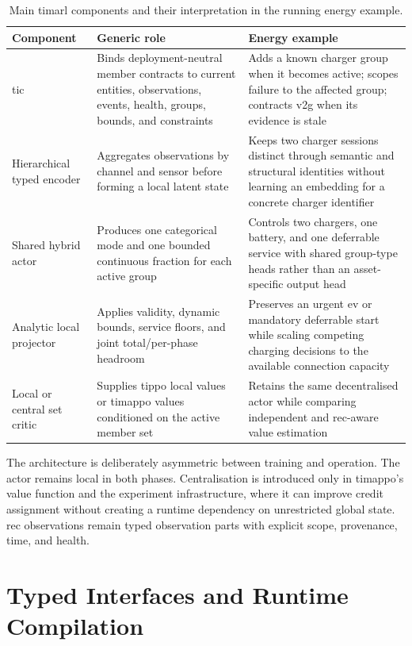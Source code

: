 \begin{table}[htbp]
\centering
\caption{Main \gls{timarl} components and their interpretation in the running energy example.}
\label{tab:timarl-components}
\begin{tabularx}{\textwidth}{@{}p{}p{}X@{}}
\toprule
\textbf{Component} & \textbf{Generic role} & \textbf{Energy example} \\
\midrule
\gls{tic} & Binds deployment-neutral member contracts to current entities, observations, events, health, groups, bounds, and constraints & Adds a known charger group when it becomes active; scopes failure to the affected group; contracts \gls{v2g} when its evidence is stale \\
Hierarchical typed encoder & Aggregates observations by channel and sensor before forming a local latent state & Keeps two charger sessions distinct through semantic and structural identities without learning an embedding for a concrete charger identifier \\
Shared hybrid actor & Produces one categorical mode and one bounded continuous fraction for each active group & Controls two chargers, one battery, and one deferrable service with shared group-type heads rather than an asset-specific output head \\
Analytic local projector & Applies validity, dynamic bounds, service floors, and joint total/per-phase headroom & Preserves an urgent \gls{ev} or mandatory deferrable start while scaling competing charging decisions to the available connection capacity \\
Local or central set critic & Supplies \gls{tippo} local values or \gls{timappo} values conditioned on the active member set & Retains the same decentralised actor while comparing independent and \gls{rec}-aware value estimation \\
\bottomrule
\end{tabularx}
\end{table}

The architecture is deliberately asymmetric between training and operation. The actor remains local in both phases. Centralisation is introduced only in \gls{timappo}'s value function and the experiment infrastructure, where it can improve credit assignment without creating a runtime dependency on unrestricted global state. \gls{rec} observations remain typed observation parts with explicit scope, provenance, time, and health.

\section{Typed Interfaces and Runtime Compilation}
\label{sec:runtime-interface-model}

